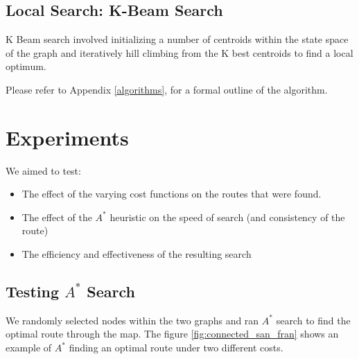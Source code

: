 \documentclass[11pt]{article}
\begin{document}
\subsection{Local Search: K-Beam Search}

K Beam search involved initializing a number of centroids within the state space of the graph and iteratively hill climbing from the K best centroids to find a local optimum.
\par
Please refer to Appendix \ref{algorithms},  for a formal outline of the algorithm.

\section{Experiments}
We aimed to test:
\begin{itemize}
\item The effect of the varying cost functions on the routes that were found.
\item The effect of the $A^{*}$ heuristic on the speed of search (and consistency of the route)
\item The efficiency and effectiveness of the resulting search
\end{itemize}

\subsection{Testing $A^{*}$ Search}
We randomly selected nodes within the two graphs and ran $A^{*}$ search to find the optimal route through the map. The figure \ref{fig:connected_san_fran} shows an example of $A^{*}$ finding an optimal route under two different costs.
\end{document}
